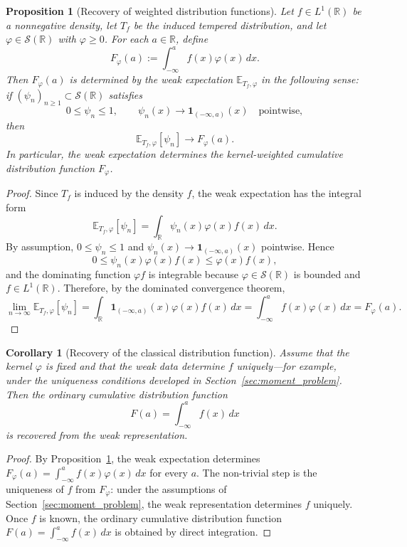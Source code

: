 \documentclass[12pt]{article}
\newtheorem{proposition}[theorem]{Proposition}
\newtheorem{corollary}[theorem]{Corollary}
\theoremstyle{definition}
\newcommand{\R}{\mathbb{R}}
\newcommand{\E}{\mathbb{E}}
\begin{document}
\begin{proposition}[Recovery of weighted distribution functions]
\label{prop:weighted-cdf-recovery}
Let $f\in L^1(\R)$ be a nonnegative density, let $T_f$ be the induced
tempered distribution, and let $\varphi\in\mathcal{S}(\R)$ with
$\varphi\ge 0$. For each $a\in\R$, define
\[
F_{\varphi}(a):=\int_{-\infty}^{a} f(x)\varphi(x)\,dx .
\]
Then $F_{\varphi}(a)$ is determined by the weak expectation
$\E_{T_f,\varphi}$ in the following sense: if $(\psi_n)_{n\ge1}\subset
\mathcal{S}(\R)$ satisfies
\[
0\le \psi_n\le 1,\qquad \psi_n(x)\to \mathbf{1}_{(-\infty,a)}(x)
\quad\text{pointwise},
\]
then
\[
\E_{T_f,\varphi}[\psi_n]\longrightarrow F_{\varphi}(a).
\]
In particular, the weak expectation determines the kernel-weighted cumulative
distribution function $F_{\varphi}$.
\end{proposition}

\begin{proof}
Since $T_f$ is induced by the density $f$, the weak expectation has the
integral form
\[
\E_{T_f,\varphi}[\psi_n]
=\int_{\R}\psi_n(x)\varphi(x)f(x)\,dx.
\]
By assumption, $0\le \psi_n\le 1$ and $\psi_n(x)\to \mathbf{1}_{(-\infty,a)}(x)$
pointwise. Hence
\[
0\le \psi_n(x)\varphi(x)f(x)\le \varphi(x)f(x),
\]
and the dominating function $\varphi f$ is integrable because
$\varphi\in\mathcal{S}(\R)$ is bounded and $f\in L^1(\R)$.
Therefore, by the dominated convergence theorem,
\[
\lim_{n\to\infty}\E_{T_f,\varphi}[\psi_n]
=
\int_{\R}\mathbf{1}_{(-\infty,a)}(x)\varphi(x)f(x)\,dx
=
\int_{-\infty}^{a} f(x)\varphi(x)\,dx = F_\varphi(a).
\]
\end{proof}

\begin{corollary}[Recovery of the classical distribution function]
\label{cor:cdf-recovery}
Assume that the kernel $\varphi$ is fixed and that the weak data
determine $f$ uniquely---for example, under the uniqueness conditions developed
in Section~\ref{sec:moment_problem}. Then the ordinary cumulative distribution function
\[
F(a)=\int_{-\infty}^{a} f(x)\,dx
\]
is recovered from the weak representation.
\end{corollary}

\begin{proof}
By Proposition~\ref{prop:weighted-cdf-recovery}, the weak expectation
determines $F_{\varphi}(a)=\int_{-\infty}^{a}f(x)\varphi(x)\,dx$ for every
$a$. The non-trivial step is the uniqueness of $f$ from $F_\varphi$: under the
assumptions of Section~\ref{sec:moment_problem}, the weak representation
determines $f$ uniquely. Once $f$ is known, the ordinary cumulative
distribution function $F(a)=\int_{-\infty}^{a}f(x)\,dx$ is obtained by direct integration.
\end{proof}
\end{document}
